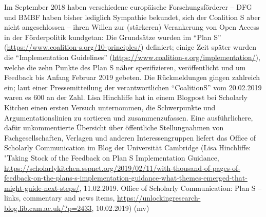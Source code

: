 \documentclass[a4paper,
fontsize=11pt,
oneside,
numbers=noperiodatend,
parskip=half-,
bibliography=totoc,
final
]{scrartcl}
\begin{document}
Im September 2018 haben verschiedene europäische Forschungsförderer --
DFG und BMBF haben bisher lediglich Sympathie bekundet, sich der
Coalition S aber nicht angeschlossen -- ihren Willen zur (stärkeren)
Verankerung von Open Access in der Förderpolitik kundgetan: Die
Grundsätze wurden im \enquote{Plan S}
(\url{https://www.coalition-s.org/10-principles/}) definiert; einige
Zeit später wurden die \enquote{Implementation Guidelines}
(\url{https://www.coalition-s.org/implementation/}), welche die zehn
Punkte des Plan S näher spezifizieren, veröffentlicht und um Feedback
bis Anfang Februar 2019 gebeten. Die Rückmeldungen gingen zahlreich ein;
laut einer Pressemitteilung der verantwortlichen \enquote{CoalitionS}
vom 20.02.2019 waren es 600 an der Zahl. Lisa Hinchliffe hat in einem
Blogpost bei Scholarly Kitchen einen ersten Versuch unternommen, die
Schwerpunkte und Argumentationslinien zu sortieren und zusammenzufassen.
Eine ausführlichere, dafür unkommentierte Übersicht über öffentliche
Stellungnahmen von Fachgesellschaften, Verlagen und anderen
Interessengruppen liefert das Office of Scholarly Communication im Blog
der Universität Cambridge (Lisa Hinchliffe: "Taking Stock of the
Feedback on Plan S Implementation Guidance,
\url{https://scholarlykitchen.sspnet.org/2019/02/11/with-thousand-of-pages-of-feedback-on-the-plans-s-implementation-guidance-what-themes-emerged-that-might-guide-next-steps/},
11.02.2019. Office of Scholarly Communication: Plan S -- links,
commentary and news items,
\url{https://unlockingresearch-blog.lib.cam.ac.uk/?p=2433}, 10.02.2019)
(mv)

\end{document}
